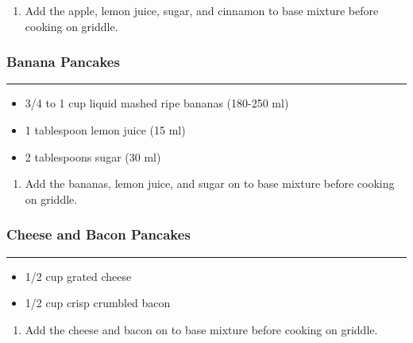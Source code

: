 \documentclass{article}
\begin{document}
\begin{enumerate}
    \item 
        Add the apple, lemon juice, sugar, and cinnamon to base mixture before cooking on griddle.
\end{enumerate}

\subsubsection{Banana Pancakes} 
\noindent\rule[0.5ex]{\linewidth}{0.5pt}

\begin{framed}
    \begin{itemize}
        \item 3/4 to 1 cup liquid mashed ripe bananas (180-250 ml)
        \item 1 tablespoon lemon juice (15 ml) 
        \item 2 tablespoons sugar (30 ml)
    \end{itemize}
\end{framed}

\begin{enumerate}
    \item 
        Add the bananas, lemon juice, and sugar on to base mixture before cooking on griddle.
\end{enumerate}

\subsubsection{Cheese and Bacon Pancakes} 
\noindent\rule[0.5ex]{\linewidth}{0.5pt}

\begin{framed}
    \begin{itemize}
        \item 1/2 cup grated cheese 
        \item 1/2 cup crisp crumbled bacon
    \end{itemize}
\end{framed}

\begin{enumerate}
    \item 
        Add the cheese and bacon on to base mixture before cooking on griddle.
\end{enumerate}
\end{document}
